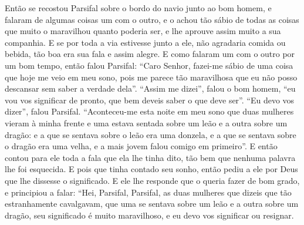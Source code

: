 Então se recostou Parsifal sobre o bordo do navio junto ao bom homem, e
falaram de algumas coisas um com o outro, e o achou tão sábio de todas as
coisas que muito o maravilhou quanto poderia ser, e lhe aprouve assim muito a
sua companhia. E se por toda a via estivesse junto a ele, não agradaria comida
ou bebida, tão boa era sua fala e assim alegre. E como falaram um com
o outro por um bom tempo, então falou Parsifal: “Caro Senhor, fazei-me sábio
de uma coisa que hoje me veio em meu sono, pois me parece tão maravilhosa que
eu não posso descansar sem saber a verdade dela”. “Assim me dizei”, falou o bom
homem, “eu vou vos significar de pronto, que bem deveis saber o que deve ser”.
“Eu devo vos dizer”, falou Parsifal. “Aconteceu-me esta noite em meu sono que
duas mulheres vieram à minha frente e uma estava sentada sobre um leão e a
outra sobre um dragão: e a que se sentava sobre o leão era uma donzela, e a que
se sentava sobre o dragão era uma velha, e a mais jovem falou comigo em
primeiro”. E então contou para ele toda a fala que ela lhe tinha dito, tão bem
que nenhuma palavra lhe foi esquecida. E pois que tinha contado seu sonho,
então pediu a ele por Deus que lhe dissesse o significado. E ele lhe responde
que o queria fazer de bom grado, e principiou a falar: “Hei, Parsifal,
Parsifal, as duas mulheres que dizeis que tão estranhamente cavalgavam, que
uma se sentava sobre um leão e a outra sobre um dragão, seu significado é muito
maravilhoso, e eu devo vos significar ou resignar.

